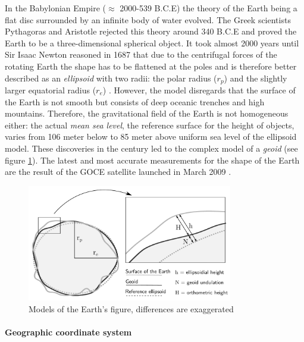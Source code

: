 In the Babylonian Empire ($\approx$ 2000-539 B.C.E) the theory of the Earth being a flat disc surrounded by an infinite body of water evolved.
The Greek scientists Pythagoras and Aristotle rejected this theory around 340 B.C.E and proved the Earth to be a three-dimensional spherical object. It took almost 2000 years until Sir Isaac Newton reasoned in 1687 that due to the centrifugal forces of the rotating Earth the shape has to be flattened at the poles and is therefore better described as an \emph{ellipsoid} with two radii: the polar radius ($r_p$) and the slightly larger equatorial radius ($r_e$)
\cite[pp. 69-77]{bolstad2008gis}. However, the model disregards that the surface of the Earth is not smooth but consists of deep oceanic trenches and high mountains. Therefore, the gravitational field of the Earth is not homogeneous either: the actual \emph{mean sea level}, the reference surface for the height of objects, varies from 106 meter below to 85 meter above uniform sea level of the ellipsoid model. These discoveries in the  century led to the complex model of a \emph{geoid} (see figure \ref{fig:geoid}). The latest and most accurate measurements for the shape of the Earth are the result of the GOCE satellite launched in March 2009
\cite{geoid, geoidESRI}.

\begin{figure}[H]
  \centering
  \includegraphics[width=0.8\textwidth]{graphics/basics/hgis/earth_models}
  \caption{Models of the Earth's figure, differences are exaggerated \cite[Fig. 3-6, p. 75]{bolstad2008gis}}
  \label{fig:geoid}
\end{figure}


\paragraph{Geographic coordinate system} %
\label{ssub:geographic_coordinate_system}

